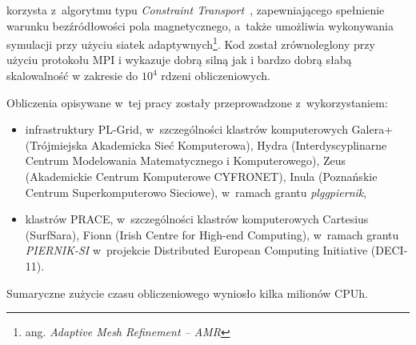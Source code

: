 korzysta z~algorytmu typu \emph{Constraint Transport}~\cite{EH88}, zapewniającego
spełnienie warunku bezźródłowości pola magnetycznego, a~także umożliwia
wykonywania symulacji przy użyciu siatek adaptywnych\footnote{ang.
\emph{Adaptive Mesh Refinement -- AMR}}. Kod został zrównoleglony przy użyciu
protokołu MPI i wykazuje dobrą silną jak i bardzo dobrą słabą skalowalność w
zakresie do $10^4$ rdzeni obliczeniowych.
%
\par Obliczenia opisywane w~tej pracy zostały przeprowadzone z~wykorzystaniem:
%
\begin{itemize}
   \item infrastruktury PL-Grid, w~szczególności klastrów
      komputerowych Galera+ (Trójmiejska Akademicka Sieć Komputerowa), Hydra
      (Interdyscyplinarne Centrum Modelowania Matematycznego i Komputerowego),
      Zeus (Akademickie Centrum Komputerowe CYFRONET), Inula (Poznańskie Centrum
      Superkomputerowo Sieciowe), w~ramach grantu \emph{plggpiernik},
   \item klastrów PRACE, w~szczególności klastrów komputerowych
      Cartesius (SurfSara), Fionn (Irish Centre for High-end Computing),
      w~ramach grantu \emph{PIERNIK-SI} w~projekcie Distributed European
      Computing Initiative (DECI-11).
\end{itemize}
Sumaryczne zużycie czasu obliczeniowego wyniosło kilka milionów CPUh.
%
